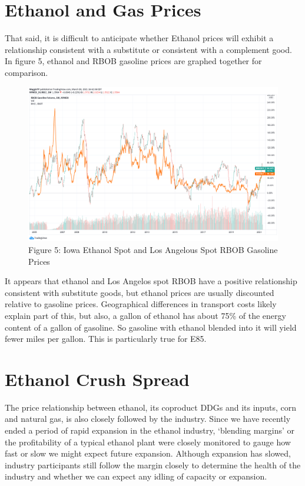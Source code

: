 \documentclass[
]{book}
\begin{document}
\hypertarget{ethanol-and-gas-prices}{%
\section{Ethanol and Gas Prices}\label{ethanol-and-gas-prices}}

That said, it is difficult to anticipate whether Ethanol prices will exhibit a relationship consistent with a substitute or consistent with a complement good. In figure 5, ethanol and RBOB gasoline prices are graphed together for comparison.

\begin{figure}
\centering
\includegraphics{assets/EthRBOB.png}
\caption{Figure 5: Iowa Ethanol Spot and Los Angelous Spot RBOB Gasoline Prices}
\end{figure}

It appears that ethanol and Los Angelos spot RBOB have a positive relationship consistent with substitute goods, but ethanol prices are usually discounted relative to gasoline prices. Geographical differences in transport costs likely explain part of this, but also, a gallon of ethanol has about 75\% of the energy content of a gallon of gasoline. So gasoline with ethanol blended into it will yield fewer miles per gallon. This is particularly true for E85.

\hypertarget{ethanol-crush-spread}{%
\section{Ethanol Crush Spread}\label{ethanol-crush-spread}}

The price relationship between ethanol, its coproduct DDGs and its inputs, corn and natural gas, is also closely followed by the industry. Since we have recently ended a period of rapid expansion in the ethanol industry, `blending margins' or the profitability of a typical ethanol plant were closely monitored to gauge how fast or slow we might expect future expansion. Although expansion has slowed, industry participants still follow the margin closely to determine the health of the industry and whether we can expect any idling of capacity or expansion.
\end{document}
